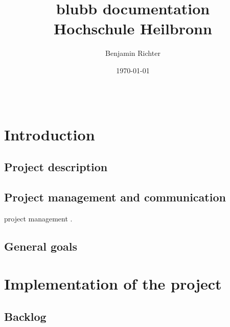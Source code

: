 \documentclass[12pt,a4paper,oneside]{report}
\newcommand{\appname}{blubb}
\begin{document}
\begin{lstlisting}
\end{lstlisting}
%
\title{
	{\huge \appname{} documentation}
	{\\ \large Hochschule Heilbronn}
}
\author{Benjamin Richter}
\date{\today}
\maketitle
\tableofcontents

\chapter{Introduction}

\section{Project description}

\section{Project management and communication}
project management \citep{mihaela2013measurement}. 


\section{General goals}


\chapter{Implementation of the project}

\section{Backlog}
\end{document}
